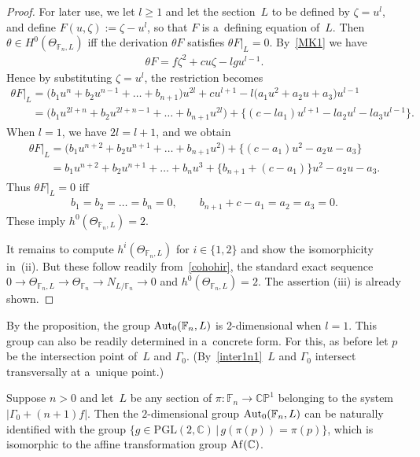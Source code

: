 \begin{proof}
For later use, we let $l\ge 1$ and let the section~$L$ to be def\/ined by $\zeta = u^l$, and def\/ine $F(u,\zeta):=
\zeta - u^l$, so that $F$ is a~def\/ining equation of~$L$.
Then $\theta\in H^0(\Theta_{\mathbb{F}_n,L})$ if\/f the derivation $\theta F$ satisf\/ies $\theta F|_L = 0$.
By~\eqref{MK1} we have
\begin{gather*}
\theta F = f\zeta^2 + c u \zeta - lgu^{l-1}.
\end{gather*}
Hence by substituting $\zeta = u^l$, the restriction becomes
\begin{gather}
\theta F |_L = \big(b_1 u^n + b_2 u^{n-1} + \dots + b_{n+1}\big) u^{2l} + c u^{l+1} - l \big(a_1 u^2 + a_2 u + a_3\big) u^{l-1}
\nonumber
\\
\phantom{\theta F |_L}{}
= \big(b_1 u^{2l+n} + b_2 u^{2l+n-1} + \dots + b_{n+1}u^{2l}\big) + \big\{(c-la_1) u^{l+1} - la_2 u^l - la_3 u^{l-1}\big\}.
\label{der1}
\end{gather}
When $l=1$, we have $2l = l+1$, and we obtain
\begin{gather*}
\theta F|_L = \big(b_1 u^{n+2} + b_2 u^{n+1} + \dots + b_{n+1}u^{2}\big) + \big\{(c-a_1) u^{2} - a_2 u - a_3 \big\}
\\
\phantom{\theta F|_L}{}
= b_1 u^{n+2} + b_2 u^{n+1} + \dots + b_n u^3 + \{b_{n+1} + (c -a_1)\} u^2 - a_2 u - a_3.
\end{gather*}
Thus $\theta F|_L = 0$ if\/f{\samepage
\begin{gather*}
b_1=b_2=\dots=b_{n} = 0,
\qquad
b_{n+1} + c - a_1 = a_2 = a_3 = 0.
\end{gather*}
These imply $h^0(\Theta_{\mathbb{F}_n, L}) = 2$.}

It remains to compute $h^i(\Theta_{\mathbb{F}_n, L})$ for $i\in \{1,2\}$ and show the isomorphicity in~(ii).
But these follow readily from~\eqref{cohohir}, the standard exact sequence $ 0 \to \Theta_{\mathbb{F}_n, L} \to
\Theta_{\mathbb{F}_n} \to N_{L/\mathbb{F}_n}\to 0$ and $h^0(\Theta_{\mathbb{F}_n, L})=2$.
The assertion (iii) is already shown.
\end{proof}

By the proposition, the group ${\rm{Aut}}_0(\mathbb{F}_n,L)$ is 2-dimensional when $l=1$.
This group can also be readily determined in a~concrete form.
For this, as before let $p$ be the intersection point of~$L$ and $\Gamma_0$.
(By~\eqref{inter1n1}~$L$ and $\Gamma_0$ intersect transversally at a~unique point.)

\begin{Proposition}\label{prop:nonred}
Suppose $n>0$ and let~$L$ be any section of $\pi:\mathbb{F}_n\to \mathbb{CP}^1$ belonging to the system $|\Gamma_0+(n+1)f|$.
Then the $2$-dimensional group ${\rm{Aut}}_0(\mathbb{F}_n, L)$ can be naturally identified with
the group $\{g\in\mathrm{PGL}(2,\mathbb{C}) \,|\, g(\pi(p)) = \pi(p)\}$, which is isomorphic
to the affine transformation group ${\rm Af}(\mathbb{C})$.
\end{Proposition}

